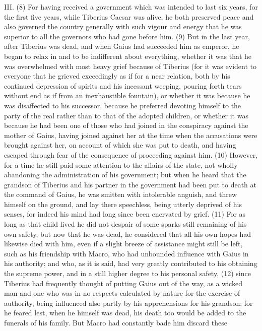 III. (8) For having received a government which was intended to last six years, for the first five
years, while Tiberius Caesar was alive, he both preserved peace and also governed the country
generally with such vigour and energy that he was superior to all the governors who had gone
before him. (9) But in the last year, after Tiberius was dead, and when Gaius had succeeded him
as emperor, he began to relax in and to be indifferent about everything, whether it was that he was
overwhelmed with most heavy grief because of Tiberius (for it was evident to everyone that he
grieved exceedingly as if for a near relation, both by his continued depression of spirits and his
incessant weeping, pouring forth tears without end as if from an inexhaustible fountain), or whether
it was because he was disaffected to his successor, because he preferred devoting himself to the
party of the real rather than to that of the adopted children, or whether it was because he had been
one of those who had joined in the conspiracy against the mother of Gaius, having joined against
her at the time when the accusations were brought against her, on account of which she was put to
death, and having escaped through fear of the consequence of proceeding against him. (10)
However, for a time he still paid some attention to the affairs of the state, not wholly abandoning
the administration of his government; but when he heard that the grandson of Tiberius and his
partner in the government had been put to death at the command of Gaius, he was smitten with
intolerable anguish, and threw himself on the ground, and lay there speechless, being utterly
deprived of his senses, for indeed his mind had long since been enervated by grief. (11) For as
long as that child lived he did not despair of some sparks still remaining of his own safety, but now
that he was dead, he considered that all his own hopes had likewise died with him, even if a slight
breeze of assistance might still be left, such as his friendship with Macro, who had unbounded
influence with Gaius in his authority; and who, as it is said, had very greatly contributed to his
obtaining the supreme power, and in a still higher degree to his personal safety, (12) since Tiberius
had frequently thought of putting Gaius out of the way, as a wicked man and one who was in no
respects calculated by nature for the exercise of authority, being influenced also partly by his
apprehensions for his grandson; for he feared lest, when he himself was dead, his death too would
be added to the funerals of his family. But Macro had constantly bade him discard these
